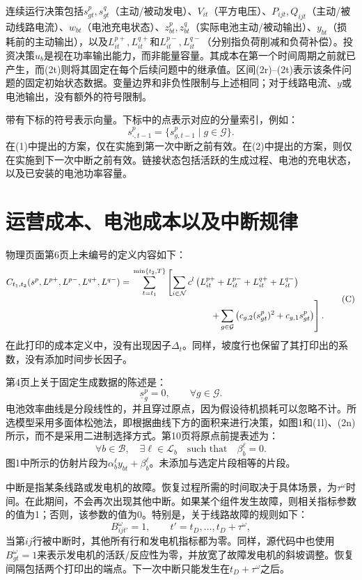 \documentclass[10pt]{article}
\begin{document}
连续运行决策包括$s_{gt}^p,s_{gt}^q$（主动/被动发电）、$V_{it}$（平方电压）、$P_{ijt},Q_{ijt}$（主动/被动线路电流）、$w_{bt}$（电池充电状态）、$z_{bt}^p,z_{bt}^q$（实际电池主动/被动输出）、$y_{bt}$（损耗前的主动输出），以及$L_{it}^{p+},L_{it}^{q+}$和$L_{it}^{p-},L_{it}^{q-}$（分别指负荷削减和负荷补偿）。投资决策$u_b$是视在功率输出能力，而非能量容量。其成本在第一个时间周期之前就已产生，而(2t)则将其固定在每个后续问题中的继承值。区间(2r)--(2t)表示该条件问题的固定初始状态数据。变量边界和非负性限制与上述相同；对于线路电流、$y$或电池输出，没有额外的符号限制。

带有下标的符号表示向量。下标中的点表示对应的分量索引，例如：
\[
s_{\cdot,t-1}^p=\{s_{g,t-1}^p\mid g\in\mathcal G\}.
\]
在(1)中提出的方案，仅在实施到第一次中断之前有效。在(2)中提出的方案，则仅在实施到下一次中断之前有效。链接状态包括活跃的生成过程、电池的充电状态，以及已安装的电池功率容量。

\section*{运营成本、电池成本以及中断规律}
物理页面第6页上未编号的定义内容如下：
\begin{equation}
\begin{aligned}
C_{t_1,t_2}(s^p,L^{p+},L^{p-},L^{q+},L^{q-})
={}&\sum_{t=t_1}^{\min\{t_2,T\}}\left[\sum_{i\in\mathcal N}c^l\left(L_{it}^{p+}+L_{it}^{p-}+L_{it}^{q+}+L_{it}^{q-}\right)\right.\\
&\left.\hspace{31mm}+\sum_{g\in\mathcal G}\left(c_{g,2}(s_{gt}^p)^2+c_{g,1}s_{gt}^p\right)\right].
\end{aligned}\tag{C}
\end{equation}
在此打印的成本定义中，没有出现因子$\Delta_t$。同样，坡度行也保留了其打印出的系数，没有添加时间步长因子。

第4页上关于固定生成数据的陈述是：
\[
\underline s_g^p=0,\qquad\forall g\in\mathcal G.
\]
电池效率曲线是分段线性的，并且穿过原点，因为假设待机损耗可以忽略不计。所选模型采用多面体松弛法，即根据曲线下方的面积来进行决策，如图1和(1l)、(2n)所示，而不是采用二进制选择方式。第10页将原点前提表述为：
\[
\forall b\in\mathcal B,\quad\exists\ell\in\mathcal L_b\quad\text{such that}\quad\beta_b^\ell=0.
\]
图1中所示的仿射片段为$\alpha_b^\ell y_{bt}+\beta_b^\ell$。未添加与选定片段相等的片段。

中断是指某条线路或发电机的故障。恢复过程所需的时间取决于具体场景，为$\tau^\omega$时间。在此期间，不会再次出现其他中断。如果某个组件发生故障，则相关指标参数的值为1；否则，该参数的值为0。特别是，关于线路故障的规则如下：
\[
B_{ijt'}^\omega=1,\qquad t'=t_D,\ldots,t_D+\tau^\omega,
\]
当第$ij$行被中断时，其他所有行和发电机指标都为零。同样，源代码中也使用$B_{gt}^\omega=1$来表示发电机的活跃/反应性为零，并放宽了故障发电机的斜坡调整。恢复间隔包括两个打印出的端点。下一次中断只能发生在$t_D+\tau^\omega$之后。
\end{document}
